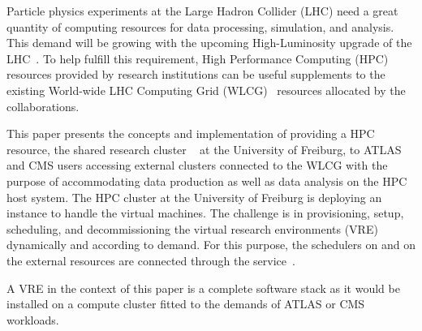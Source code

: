 
Particle physics experiments at the Large Hadron Collider (LHC) need a
great quantity of computing resources for data processing, simulation, and analysis.
This demand will be growing with the upcoming High-Luminosity upgrade of the LHC~\cite{HLLHCcompneeds}.
To help fulfill this requirement, High Performance Computing (HPC) resources provided by research institutions
can be useful supplements to the existing World-wide LHC Computing
Grid (WLCG)~\cite{wlcg} resources
allocated by the collaborations.


This paper presents the concepts and implementation of providing a HPC resource, the
shared research cluster \NEMO~\cite{nemo} at the University of Freiburg, to ATLAS and CMS users accessing external clusters connected to the WLCG with the purpose of accommodating data production as well as
data analysis on the HPC host system. The HPC cluster \NEMO at
the University of Freiburg is deploying an \Openstack~\cite{Openstack} instance to handle the
virtual machines. The challenge is in provisioning, setup, scheduling, and decommissioning the virtual research environments (VRE) dynamically and according to demand. For this purpose, the schedulers on \NEMO and on the external resources are
connected through the \Roced service~\cite{ROCED}.

A VRE in the context of this paper is a complete software stack
as it would be installed on a compute cluster fitted to the demands of ATLAS or CMS workloads.
